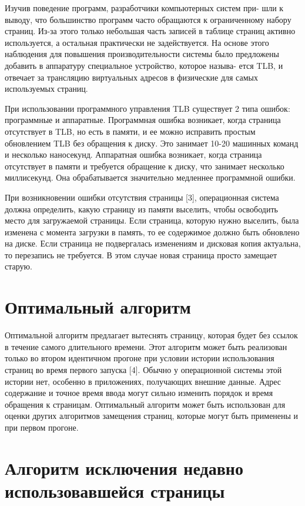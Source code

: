 Изучив поведение программ, разработчики компьютерных систем при-
шли к выводу, что большинство программ часто обращаются к ограниченному
набору страниц. Из-за этого только небольшая часть записей в таблице страниц активно используется, а остальная практически не задействуется. На
основе этого наблюдения для повышения производительности системы было
предложены добавить в аппаратуру специальное устройство, которое называ-
ется TLB, и отвечает за трансляцию виртуальных адресов в физические для
самых используемых страниц.

При использовании программного управления TLB существует 2 типа
ошибок: программные и аппаратные. Программная ошибка возникает, когда
страница отсутствует в TLB, но есть в памяти, и ее можно исправить простым
обновлением TLB без обращения к диску. Это занимает 10-20 машинных команд и несколько наносекунд. Аппаратная ошибка возникает, когда страница
отсутствует в памяти и требуется обращение к диску, что занимает несколько миллисекунд. Она обрабатывается значительно медленнее программной
ошибки.

При возникновении ошибки отсутствия страницы [3], операционная
система должна определить, какую страницу из памяти выселить, чтобы
освободить место для загружаемой страницы. Если страница, которую нужно
выселить, была изменена с момента загрузки в память, то ее содержимое
должно быть обновлено на диске. Если страница не подвергалась изменениям
и дисковая копия актуальна, то перезапись не требуется. В этом случае новая
страница просто замещает старую.

\section{Оптимальный алгоритм}

Оптимальной алгоритм предлагает вытеснять страницу, которая будет
без ссылок в течение самого длительного времени. Этот алгоритм может
быть реализован только во втором идентичном прогоне при условии истории
использования страниц во время первого запуска [4]. Обычно у операционной
системы этой истории нет, особенно в приложениях, получающих внешние
данные. Адрес содержание и точное время ввода могут сильно изменить
порядок и время обращения к страницам. Оптимальный алгоритм может
быть использован для оценки других алгоритмов замещения страниц, которые
могут быть применены и при первом прогоне.

\section{Алгоритм исключения недавно	использовавшейся страницы}

